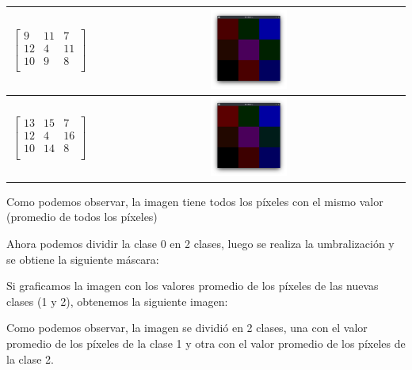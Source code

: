 \begin{tabular}{|c|c|}
    \\
    \hline
    \begin{equation*}
        \begin{bmatrix}
            9  & 11 & 7  \\
            12 & 4  & 11 \\
            10 & 9  & 8  \\
        \end{bmatrix}
    \end{equation*}
    &
    \includegraphics[width=0.25\textwidth]{./latex/img/m3}
    \\
    \hline
    \begin{equation*}
        \begin{bmatrix}
            13 & 15 & 7  \\
            12 & 4  & 16 \\
            10 & 14 & 8  \\
        \end{bmatrix}
    \end{equation*}
    &
    \includegraphics[width=0.25\textwidth]{./latex/img/m4}
    \\
    \hline
\end{tabular}

\newpage

Como podemos observar, la imagen tiene todos los píxeles con el mismo valor (promedio de todos los píxeles)

Ahora podemos dividir la clase 0 en 2 clases, luego se realiza la umbralización y se obtiene la siguiente máscara:

Si graficamos la imagen con los valores promedio de los píxeles de las nuevas clases (1 y 2), obtenemos la siguiente imagen:

Como podemos observar, la imagen se dividió en 2 clases, una con el valor promedio de los píxeles de la clase 1 y otra con el valor promedio de los píxeles de la clase 2.
